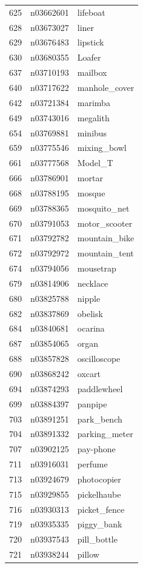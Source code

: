 \begin{table}
\begin{tabular}{cll}
625 & n03662601 & lifeboat \\
628 & n03673027 & liner \\
629 & n03676483 & lipstick \\
630 & n03680355 & Loafer \\
637 & n03710193 & mailbox \\
640 & n03717622 & manhole_cover \\
642 & n03721384 & marimba \\
649 & n03743016 & megalith \\
654 & n03769881 & minibus \\
659 & n03775546 & mixing_bowl \\
661 & n03777568 & Model_T \\
666 & n03786901 & mortar \\
668 & n03788195 & mosque \\
669 & n03788365 & mosquito_net \\
670 & n03791053 & motor_scooter \\
671 & n03792782 & mountain_bike \\
672 & n03792972 & mountain_tent \\
674 & n03794056 & mousetrap \\
679 & n03814906 & necklace \\
680 & n03825788 & nipple \\
682 & n03837869 & obelisk \\
684 & n03840681 & ocarina \\
687 & n03854065 & organ \\
688 & n03857828 & oscilloscope \\
690 & n03868242 & oxcart \\
694 & n03874293 & paddlewheel \\
699 & n03884397 & panpipe \\
703 & n03891251 & park_bench \\
704 & n03891332 & parking_meter \\
707 & n03902125 & pay-phone \\
711 & n03916031 & perfume \\
713 & n03924679 & photocopier \\
715 & n03929855 & pickelhaube \\
716 & n03930313 & picket_fence \\
719 & n03935335 & piggy_bank \\
720 & n03937543 & pill_bottle \\
721 & n03938244 & pillow \\

\end{tabular}
\end{table}

